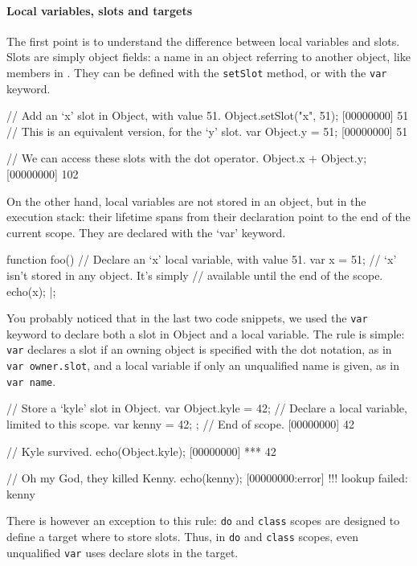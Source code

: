 \paragraph{Local variables, slots and targets}
The first point is to understand the difference between local
variables and slots. Slots are simply object fields: a name in an
object referring to another object, like members in \Cxx. They can be
defined with the \lstinline|setSlot| method, or with the
\lstinline|var| keyword.

\begin{urbiscript}
// Add an `x' slot in Object, with value 51.
Object.setSlot("x", 51);
[00000000] 51
// This is an equivalent version, for the `y' slot.
var Object.y = 51;
[00000000] 51

// We can access these slots with the dot operator.
Object.x + Object.y;
[00000000] 102
\end{urbiscript}

On the other hand, local variables are not stored in an object, but in
the execution stack: their lifetime spans from their declaration point
to the end of the current scope. They are declared with the `var'
keyword.

\begin{urbiscript}
function foo()
{
  // Declare an `x' local variable, with value 51.
  var x = 51;
  // `x' isn't stored in any object. It's simply
  // available until the end of the scope.
  echo(x);
}|;
\end{urbiscript}

You probably noticed that in the last two code snippets, we used the
\lstinline|var| keyword to declare both a slot in Object and a local
variable. The rule is simple: \lstinline|var| declares a slot if an
owning object is specified with the dot notation, as in %
\lstinline|var owner.slot|, and a local variable if only an
unqualified name is given, as in \lstinline|var name|.

\begin{urbiscript}
{
  // Store a `kyle' slot in Object.
  var Object.kyle = 42;
  // Declare a local variable, limited to this scope.
  var kenny = 42;
}; // End of scope.
[00000000] 42

// Kyle survived.
echo(Object.kyle);
[00000000] *** 42

// Oh my God, they killed Kenny.
echo(kenny);
[00000000:error] !!! lookup failed: kenny
\end{urbiscript}

There is however an exception to this rule: \lstinline|do| and
\lstinline|class| scopes are designed to define a target where to
store slots. Thus, in \lstinline|do| and \lstinline|class| scopes,
even unqualified \lstinline|var| uses declare slots in the target.


